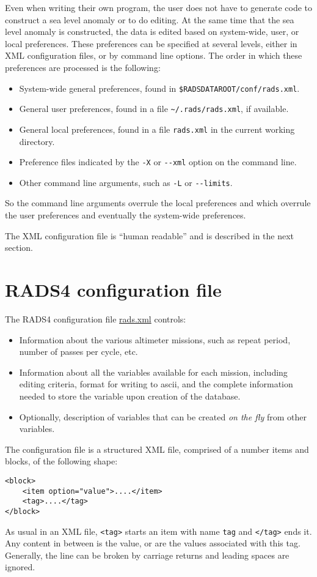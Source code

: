 \documentclass[a4paper,11pt,openany,natbib,nomargin]{thesis}
\makeatletter
\newcommand\file[1]{\url{#1}\index{files!#1@\protect\url{#1}}}
\makeatother
\begin{document}
Even when writing their own program, the user does not have to generate code to construct a sea level anomaly or to do editing. At the same time that the sea level anomaly is constructed, the data is edited based on system-wide, user, or local preferences. These preferences can be specified at several levels, either in XML configuration files, or by command line options. The order in which these preferences are processed is the following:
\begin{itemize}
\item System-wide general preferences, found in \verb|$RADSDATAROOT/conf/rads.xml|.
\item General user preferences, found in a file \verb|~/.rads/rads.xml|, if available.
\item General local preferences, found in a file \verb|rads.xml| in the current working directory.
\item Preference files indicated by the \verb|-X| or \verb|--xml| option on the command line.
\item Other command line arguments, such as \verb|-L| or \verb|--limits|.
\end{itemize}
So the command line arguments overrule the local preferences and which overrule the user preferences and eventually the system-wide preferences.

The XML configuration file is ``human readable'' and is described in the next section.

\section{RADS4 configuration file}
\label{sec:rads.xml}
The RADS4 configuration file \file{rads.xml} controls:
\begin{itemize}
\item Information about the various altimeter missions, such as repeat period, number of passes per cycle, etc.
\item Information about all the variables available for each mission, including editing criteria, format for writing to ascii, and the complete information needed to store the variable upon creation of the database.
\item Optionally, description of variables that can be created \emph{on the fly} from other variables.
\end{itemize}

The configuration file is a structured XML file, comprised of a number items and blocks, of the following shape:
\begin{verbatim}
<block>
    <item option="value">....</item>
    <tag>....</tag>
</block>
\end{verbatim}
As usual in an XML file, \verb|<tag>| starts an item with name \verb|tag| and \verb|</tag>| ends it. Any content in between is the value, or are the values associated with this tag. Generally, the line can be broken by carriage returns and leading spaces are ignored.
\end{document}
